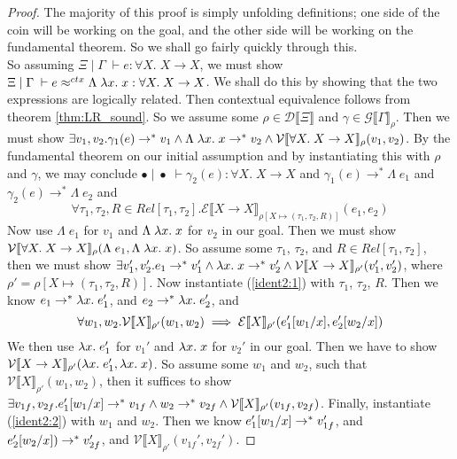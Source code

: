 \documentclass[twoside,11pt,openright]{report}
\theoremstyle{definition}
\newcommand{\var}{x}
\newcommand{\expr}{e}
\newcommand{\val}{v}
\newcommand{\valB}{w}
\newcommand{\Tvar}{X}
\newcommand{\Tlam}{\Lambda\;}
\newcommand{\subst}[3]{#1{\left[#3 \middle/ #2 \right]}}
\newcommand{\Tfunc}[2]{#1 \rightarrow #2}
\newcommand{\Tall}[2]{\forall #1.\; #2}
\newcommand{\typ}{\tau}
\newcommand{\venv}{\Gamma}
\newcommand{\tenv}{\Xi}
\newcommand{\emptenv}{\bullet}
\newcommand{\empvenv}{\bullet}
\newcommand{\jdg}[4]{#1 \; | \; #2 \; \vdash #3 : #4}
\newcommand{\jdgRel}[6]{#1 \; | \; #2 \; \vdash #3 \approx^{#4} #5 : #6}
\newcommand{\ctxRel}[5]{\jdgRel{#1}{#2}{#3}{ctx}{#4}{#5}}
\newcommand{\stepS}{\rightarrow^*}
\newcommand{\ValInp}[2]{\mathcal{V} \llbracket #1 \rrbracket_{#2}}
\newcommand{\ExpInp}[2]{\mathcal{E} \llbracket #1 \rrbracket_{#2}}
\newcommand{\VenvInp}[2]{\mathcal{G} \llbracket #1 \rrbracket_{#2}}
\newcommand{\TenvInp}[1]{\mathcal{D} \llbracket #1 \rrbracket}
\newcommand{\map}[2]{#1 \mapsto #2}
\begin{document}
\begin{proof}
  The majority of this proof is simply unfolding definitions; one side of the coin will be working on the goal, and the other side will be working on the fundamental theorem. So we shall go fairly quickly through this.\\
  So assuming $\jdg{\tenv}{\venv}{\expr}{\Tall{\Tvar}{\Tfunc{\Tvar}{\Tvar}}}$, we must show $\ctxRel{\tenv}{\venv}{\expr}{\Tlam \fun \var . \var}{\Tall{\Tvar}{\Tfunc{\Tvar}{\Tvar}}}$. We shall do this by showing that the two expressions are logically related. Then contextual equivalence follows from theorem \ref{thm:LR_sound}. So we assume some $ \rho \in \TenvInp{\tenv}$ and $\gamma \in \VenvInp{\venv}{\rho}$. Then we must show $\exists \val_1, \val_2 . \gamma_1(\expr) \stepS \val_1 \land \Tlam \fun \var . \var \stepS \val_2 \land \ValInp{\Tall{\Tvar}{\Tfunc{\Tvar}{\Tvar}}}{\rho}(\val_1, \val_2)$. By the fundamental theorem on our initial assumption and by instantiating this with $\rho$ and $\gamma$, we may conclude $\jdg{\emptenv}{\empvenv}{\gamma_2(\expr)}{\Tall{\Tvar}{\Tfunc{\Tvar}{\Tvar}}}$ and $\gamma_1(\expr) \stepS \Tlam \expr_1$ and $\gamma_2(\expr) \stepS \Tlam \expr_2$ and 
  \begin{equation}\label{ident2:1}
    \forall \typ_1, \typ_2, R \in Rel[\typ_1, \typ_2] . \ExpInp{\Tfunc{\Tvar}{\Tvar}}{\rho[\map{\Tvar}{(\typ_1, \typ_2, R)}]}(\expr_1, \expr_2)
  \end{equation}
  Now use $\Tlam \expr_1$ for $\val_1$ and $\Tlam \fun \var . \var$ for $\val_2$ in our goal. Then we must show $\ValInp{\Tall{\Tvar}{\Tfunc{\Tvar}{\Tvar}}}{\rho}(\Tlam \expr_1, \Tlam \fun \var . \var)$. So assume some $\typ_1$, $\typ_2$, and $R \in Rel[\typ_1, \typ_2]$, then we must show 
  $\exists \val_1', \val_2' . \expr_1 \stepS \val_1' \land \fun \var . \var \stepS \val_2' \land \ValInp{\Tfunc{\Tvar}{\Tvar}}{\rho'}(\val_1', \val_2')$, where $\rho' = \rho[\map{\Tvar}{(\typ_1, \typ_2, R)}]$.
  Now instantiate (\ref*{ident2:1}) with $\typ_1$, $\typ_2$, $R$. Then we know $\expr_1 \stepS \fun \var . \expr_1'$, and $\expr_2 \stepS \fun \var . \expr_2'$, and
  \begin{equation}\label{ident2:2}
    \forall \valB_1, \valB_2 . \ValInp{\Tvar}{\rho'}(\valB_{1}, \valB_{2}) \implies \ExpInp{\Tvar}{\rho'}(\subst{\expr_1'}{\var}{\valB_1}, \subst{\expr_2'}{\var}{\valB_2})
  \end{equation}
  We then use $\fun \var . \expr_1'$ for $\val_1'$ and $\fun \var . \var$ for $\val_2'$ in our goal. Then we have to show $\ValInp{\Tfunc{\Tvar}{\Tvar}}{\rho'}(\fun \var . \expr_1', \fun \var . \var)$. So assume some $\valB_1$ and $\valB_2$, such that $\ValInp{\Tvar}{\rho'}(\valB_1, \valB_2)$, then it suffices to show $\exists \val_{1f}, \val_{2f} . \subst{\expr_1'}{\var}{\valB_1} \stepS \val_{1f} \land \valB_2 \stepS \val_{2f} \land \ValInp{\Tvar}{\rho'}(\val_{1f}, \val_{2f})$. Finally, instantiate (\ref*{ident2:2}) with $\valB_1$ and $\valB_2$. Then we know $\subst{\expr_1'}{\var}{\valB_1} \stepS \val_{1f}'$, and $\subst{\expr_2'}{\var}{\valB_2}) \stepS \val_{2f}'$, and $\ValInp{\Tvar}{\rho'}(\val_{1f}', \val_{2f}')$.

\end{proof}
\end{document}

